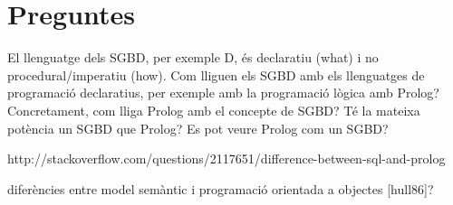 \section{Preguntes}

El llenguatge dels SGBD, per exemple D, és declaratiu (what) i no procedural/imperatiu (how). Com lliguen els SGBD amb els llenguatges de programació declaratius, per exemple amb la programació lògica amb Prolog? Concretament, com lliga Prolog amb el concepte de SGBD? Té la mateixa potència un SGBD que Prolog?
 Es pot veure Prolog com un SGBD?

http://stackoverflow.com/questions/2117651/difference-between-sql-and-prolog

diferències entre model semàntic i programació orientada a objectes [hull86]?








